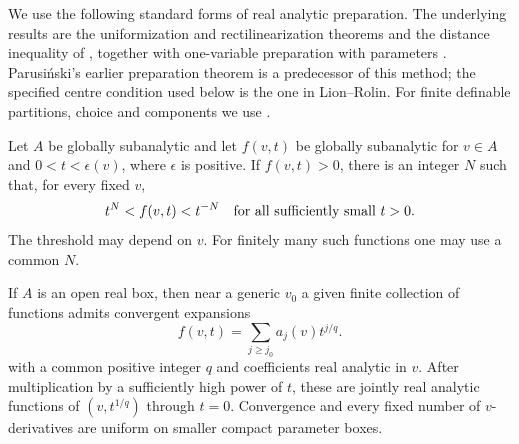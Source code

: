 We use the following standard forms of real analytic preparation.
The underlying results are the uniformization and rectilinearization
theorems and the distance inequality of
\cite[Theorems 0.1, 0.2, and 6.4]{BierstoneMilman1988}, together with
one-variable preparation with parameters
\cite[Theorem 1 and Sections 0.3--0.4]{LionRolin1997}.
Parusi\'nski's earlier preparation theorem
\cite[Theorem~7.5]{Parusinski1994} is a predecessor of this method;
the specified centre condition used below is the one in Lion--Rolin.
For finite definable partitions, choice and components we use
\cite[Theorems~2.10, 3.1 and~3.9]{Coste1999}.

\begin{lemma}
\label{prep:puiseux}
Let $A$ be globally subanalytic and let $f(v,t)$ be globally subanalytic
for $v\in A$ and $0<t<\epsilon(v)$, where $\epsilon$ is positive.
If $f(v,t)>0$, there is an integer $N$ such that, for every fixed $v$,
\[
 t^N<f(v,t)<t^{-N}
 \quad\hbox{for all sufficiently small }t>0.
\]
The threshold may depend on $v$. For finitely many such functions one
may use a common $N$.

If $A$ is an open real box, then near a generic $v_0$ a given finite
collection of functions admits convergent expansions
\[
 f(v,t)=\sum_{j\geq j_0}a_j(v)t^{j/q}.
\]
with a common positive integer $q$ and coefficients real analytic in $v$.
After multiplication by a sufficiently high power of $t$, these are
jointly real analytic functions of $(v,t^{1/q})$ through $t=0$.
Convergence and every fixed number of $v$-derivatives are uniform on
smaller compact parameter boxes.
\end{lemma}

